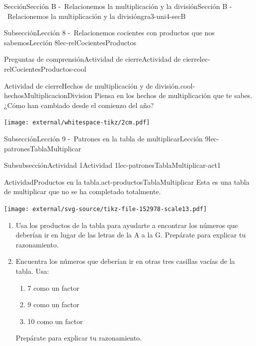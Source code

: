 \begin{sectionptx}{Sección}{Sección B -~Relacionemos la multiplicación y la división}{}{Sección B -~Relacionemos la multiplicación y la división}{}{}{gra3-uni4-secB}
\begin{subsectionptx}{Subsección}{Lección 8 -~Relacionemos cocientes con productos que nos sabemos}{}{Lección 8}{}{}{lec-relCocientesProductos}
\begin{reading-questions-subsubsection}{Preguntas de comprensión}{Actividad de cierre}{}{Actividad de cierre}{}{}{lec-relCocientesProductos-cool}
\begin{project}{Actividad de cierre}{Hechos de multiplicación y de división.}{cool-hechosMultiplicacionDivision}
Piensa en los hechos de multiplicación que te sabes. ¿Cómo han cambiado desde el comienzo del año?%
\begin{image}{0}{1}{0}{}%
\texttt{[image: external/whitespace-tikz/2cm.pdf]}
\end{image}%
\end{project}%
\end{reading-questions-subsubsection}
\end{subsectionptx}
%
%
\typeout{************************************************}
\typeout{************************************************}
%
\begin{subsectionptx}{Subsección}{Lección 9 -~Patrones en la tabla de multiplicar}{}{Lección 9}{}{}{lec-patronesTablaMultiplicar}
%
%
\typeout{************************************************}
\typeout{************************************************}
%
\begin{subsubsectionptx}{Subsubsección}{Actividad 1}{}{Actividad 1}{}{}{lec-patronesTablaMultiplicar-act1}
\begin{activity}{Actividad}{Productos en la tabla.}{act-productosTablaMultiplicar}%
Esta es una tabla de multiplicar que no se ha completado totalmente.%
\begin{image}{0}{1}{0}{}%
\texttt{[image: external/svg-source/tikz-file-152978-scale13.pdf]}
\end{image}%
%
\begin{enumerate}
\item{}Usa los productos de la tabla para ayudarte a encontrar los números que deberían ir en lugar de las letras de la A a la G. Prepárate para explicar tu razonamiento.%
\item{}Encuentra los números que deberían ir en otras tres casillas vacías de la tabla. Usa:%
%
\begin{enumerate}
\item{}7 como un factor%
\item{}9 como un factor%
\item{}10 como un factor%
\end{enumerate}
Prepárate para explicar tu razonamiento.%
\end{enumerate}
\end{activity}%
\end{subsubsectionptx}

\end{subsectionptx}
\end{sectionptx}
